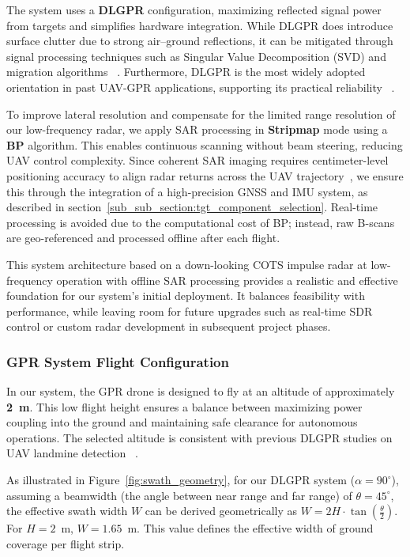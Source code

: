 The system uses a \textbf{\gls{DLGPR}} configuration, maximizing reflected signal power from targets and simplifies hardware integration. While \gls{DLGPR} does introduce surface clutter due to strong air–ground reflections, it can be mitigated through signal processing techniques such as Singular Value Decomposition (SVD) and migration algorithms ~\cite{garcia2024comparison}. Furthermore, \gls{DLGPR} is the most widely adopted orientation in past \gls{UAV}-\gls{GPR} applications, supporting its practical reliability ~\cite{alqudsi2021review}.

To improve lateral resolution and compensate for the limited range resolution of our low-frequency radar, we apply \gls{SAR} processing in \textbf{Stripmap} mode using a \textbf{\gls{BP}} algorithm. This enables continuous scanning without beam steering, reducing \gls{UAV} control complexity. Since coherent SAR imaging requires centimeter-level positioning accuracy to align radar returns across the UAV trajectory~\cite{fernandez2018synthetic}, we ensure this through the integration of a high-precision GNSS and IMU system, as described in section~\ref{sub_sub_section:tgt_component_selection}. Real-time processing is avoided due to the computational cost of \gls{BP}; instead, raw B-scans are geo-referenced and processed offline after each flight.

This system architecture based on a down-looking \gls{COTS} impulse radar at low-frequency operation with offline \gls{SAR} processing provides a realistic and effective foundation for our system’s initial deployment. It balances feasibility with performance, while leaving room for future upgrades such as real-time \gls{SDR} control or custom radar development in subsequent project phases.



\subsubsection{\gls{GPR} System Flight Configuration}\label{GPR_flight}

In our system, the \gls{GPR} drone is designed to fly at an altitude of approximately \textbf{2~m}. This low flight height ensures a balance between maximizing power coupling into the ground and maintaining safe clearance for autonomous operations. The selected altitude is consistent with previous \gls{DLGPR} studies on \gls{UAV} landmine detection ~\cite{schartel2018uav,alqudsi2021review}.

As illustrated in Figure~\ref{fig:swath_geometry}, for our \gls{DLGPR} system ($\alpha = 90^\circ$), assuming a beamwidth (the angle between near range and far range) of $\theta = 45^\circ$, the effective swath width $W$ can be derived geometrically as \(W = 2H \cdot \tan\left(\frac{\theta}{2}\right)\). For $H = 2$~m,  $W = 1.65$~m. This value defines the effective width of ground coverage per flight strip.

